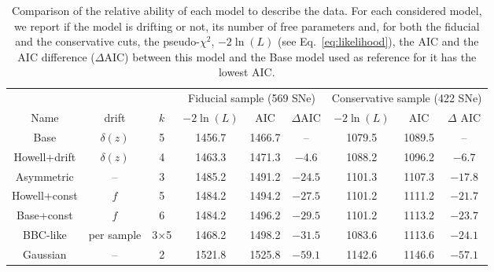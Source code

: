 \documentclass[]{aa} %
\begin{document}
\begin{table}
    \centering
    \caption{Comparison of the relative ability of each model to describe the
        data. For each considered model, we report if the model is drifting or
        not, its number of free parameters and, for both the fiducial and the
        conservative cuts, the pseudo-$\chi^2$, $-2\ln(L)$ (see
    Eq.~\ref{eq:likelihood}), the AIC and the AIC difference ($\Delta$AIC)
between this model and the Base model used as reference for it has the lowest
AIC.}
    \label{tab:comp}
    \begin{tabular}{ccc|ccc|ccc}
    \hline\hline
        & & & \multicolumn{3}{c}{Fiducial sample (569 SNe)}
            & \multicolumn{3}{|c}{Conservative sample (422 SNe)} \\
        Name & drift & $k$ &
        $-2\ln(L)$ & AIC & $\Delta$AIC & $-2\ln(L)$ & AIC & $\Delta$ AIC\\
        \hline

        Base & $\delta(z)$ & 5
        & 1456.7 & 1466.7 & -- 
        & 1079.5 & 1089.5 & -- \\

        Howell+drift & $\delta(z)$ & 4
        & 1463.3 & 1471.3 & $-4.6$
        & 1088.2 & 1096.2 & $-6.7$ 
        \\

        Asymmetric & -- & 3
        & 1485.2 & 1491.2 & $-24.5$
        & 1101.3 & 1107.3 & $-17.8$ 
        \\

        Howell+const & $f$ & 5
        & 1484.2 & 1494.2 & $-27.5$
        & 1101.2 & 1111.2 & $-21.7$ 
        \\

        Base+const & $f$ & 6
        & 1484.2 & 1496.2 & $-29.5$
        & 1101.2 & 1113.2 & $-23.7$ 
        \\

        BBC-like & per sample & 3$\times$5
        & 1468.2 & 1498.2 & $-31.5$
        & 1083.6 & 1113.6 & $-24.1$ 
        \\

        Gaussian & -- & 2
        & 1521.8 & 1525.8 & $-59.1$
        & 1142.6 & 1146.6 & $-57.1$ 
        \\
        \hline
    \end{tabular}
\end{table}
\end{document}
